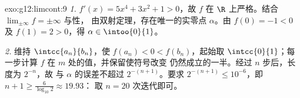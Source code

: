 \begin{solution}{exo:g12:limcont:9}
\emph{1.} $f'(x) = 5x^4 + 3x^2 + 1 > 0$，故 $f$ 在
$\R$ 上严格。结合 $\lim_{\pm\infty} f = \pm\infty$ 与性，
由双射定理，存在唯一的实零点 $\alpha$。由 $f(0) = -1 < 0$ 及
$f(1) = 2 > 0$，得 $\alpha \in \intoo{0}{1}$。

\emph{2.} 维持 $\intcc{a_n}{b_n}$，使
$f(a_n) < 0 < f(b_n)$，起始取 $\intcc{0}{1}$；每一步计算
$f$ 在 $m$ 处的值，并保留使符号改变
仍然成立的一半。经过 $n$ 步后，长度为 $2^{-n}$，故
与 $\alpha$ 的误差不超过 $2^{-(n+1)}$。要求
$2^{-(n+1)} \leq 10^{-6}$，即 $n + 1 \geq \frac{6}{\log_{10} 2} \approx 19.93$：
取 $n = 20$ 次迭代即可。
\end{solution}

